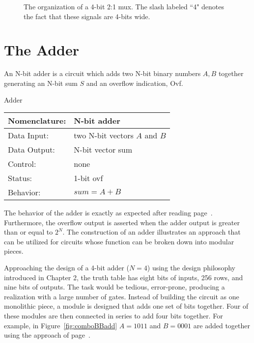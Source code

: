     \begin{figure}[ht]
        \caption{The organization of a 4-bit 2:1 mux.  The slash labeled ``4"
        denotes the fact that these signals are 4-bits wide.}
        \label{fig:comboBB4x2x1mux}
    \end{figure}

\section{The Adder}
An N-bit adder is a circuit which adds two N-bit binary numbers
$A,B$ together generating an N-bit sum $S$ and an overflow
indication, Ovf.

\begin{buildingblock}{Adder}
    \label{buildingblock:adder}
        \begin{tabular}{|l|p{3.5in}|} \hline
            Nomenclature:  & N-bit adder                \\ \hline
            Data Input:    & two N-bit vectors $A$ and $B$        \\ \hline
            Data Output:   & N-bit vector sum            \\ \hline
            Control:       & none                    \\ \hline
            Status:        & 1-bit ovf                 \\ \hline
            Behavior:      & $sum = A+B$                \\ \hline
        \end{tabular}
    \end{buildingblock}

    The behavior of the adder is exactly as expected after reading
    page~\pageref{page:addition}.  Furthermore, the overflow output is asserted
    when the adder output is greater than or equal to $2^N$.  The construction
    of an adder illustrates an approach that can be utilized for circuits
    whose function can be broken down into modular pieces.

    Approaching the design of a 4-bit adder ($N=4$) using the design
    philosophy introduced in Chapter 2, the truth table has eight bits
    of inputs, 256 rows, and nine bits of outputs.  The task would be tedious,
    error-prone, producing a realization with a large number of
    gates.  Instead of building the circuit as one monolithic piece, a module
    is designed that adds one set of bits together.  Four of these modules are
    then connected in series to add four bits together.
    For example, in Figure~\ref{fig:comboBBadd} $A=1011$ and $B=0001$ are added
    together using the approach of page~\pageref{page:addition}.

